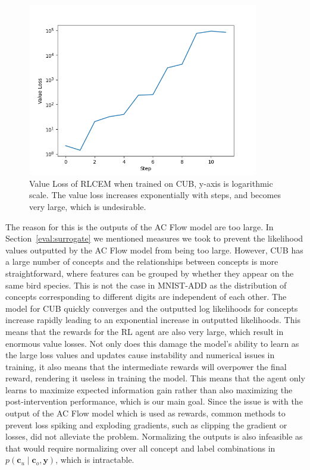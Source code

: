 \begin{figure}[!h]
    \centering
    \includegraphics[width=0.9\textwidth]{figs/evaluation/cub_v_loss_spike.png}
    \caption{
        Value Loss of RLCEM when trained on CUB,
        y-axis is logarithmic scale.
        The value loss increases exponentially with steps, 
        and becomes very large, which is undesirable.
    }
    \label{fig:cub-v-loss-spike}
\end{figure}

The reason for this is the outputs of the AC Flow model
are too large.
In Section~\ref{eval:surrogate} we mentioned measures we took to prevent
the likelihood values outputted by the AC Flow model from being too large.
However, CUB has a large number of concepts and 
the relationships between concepts is more straightforward,
where features can be grouped by
whether they appear on the same bird species.
This is not the case in MNIST-ADD as the distribution of concepts corresponding to 
different 
digits are independent of each other.
The model for CUB quickly converges and the outputted log likelihoods 
for concepts increase rapidly leading to an exponential increase 
in outputted likelihoods. This means that the rewards for the RL agent
are also very large, which result in enormous value losses.
Not only does this damage the model's ability to learn
as the large loss values and updates cause instability and numerical
issues in training,
it also means that the intermediate rewards will overpower the final reward,
rendering it useless in training the model.
This means that the agent only learns to 
maximize expected information gain rather than
also maximizing the post-intervention performance,
which is our main goal.
Since the issue is with the output of the AC Flow model
which is used as rewards, common methods to prevent loss spiking
and exploding gradients,
such as clipping the gradient or losses, did not alleviate the problem.
Normalizing the outputs is also infeasible as that would require
normalizing over all concept and label combinations in 
$p(\mathbf{c}_u \mid \mathbf{c}_o, \mathbf{y})$,
which is intractable.


